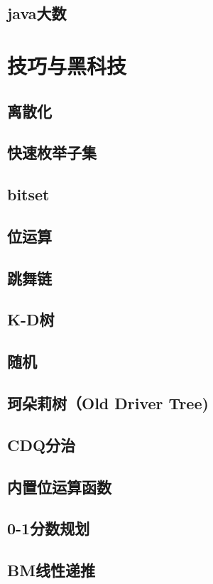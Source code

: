 \section{java大数}
\raggedbottom
\hrulefill

\chapter{技巧与黑科技}
\section{离散化}
\raggedbottom
\hrulefill
\section{快速枚举子集}
\raggedbottom
\hrulefill
\section{bitset}
\raggedbottom
\hrulefill
\section{位运算}
\raggedbottom
\hrulefill
\section{跳舞链}
\raggedbottom
\hrulefill
\section{K-D树}
\raggedbottom
\hrulefill
\section{随机}
\raggedbottom
\hrulefill
\section{珂朵莉树（Old Driver Tree)}
\raggedbottom
\hrulefill
\section{CDQ分治}
\raggedbottom
\hrulefill
\section{内置位运算函数}
\raggedbottom
\hrulefill
\section{0-1分数规划}
\raggedbottom
\hrulefill
\section{BM线性递推}
\raggedbottom
\hrulefill

